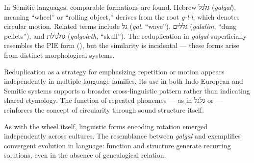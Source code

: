 In Semitic languages, comparable formations are found. Hebrew \texthebrew{גלגל} (\emph{galgal}), meaning “wheel” or “rolling object,” derives from the root \emph{g-l-l}, which denotes circular motion. Related terms include \texthebrew{גל} (\emph{gal}, “wave”), \texthebrew{גללים} (\emph{galalim}, “dung pellets”), and \texthebrew{גולגולת} (\emph{gulgoleth}, “skull”). The reduplication in \emph{galgal} superficially resembles the PIE form  (), but the similarity is incidental — these forms arise from distinct morphological systems.

Reduplication as a strategy for emphasizing repetition or motion appears independently in multiple language families. Its use in both Indo-European and Semitic systems supports a broader cross-linguistic pattern rather than indicating shared etymology. The function of repeated phonemes — as in \texthebrew{גלגל} or  — reinforces the concept of circularity through sound structure itself.

As with the wheel itself, linguistic forms encoding rotation emerged independently across cultures. The resemblance between \emph{galgal} and  exemplifies convergent evolution in language: function and structure generate recurring solutions, even in the absence of genealogical relation.



